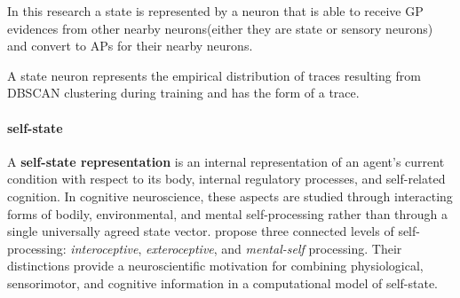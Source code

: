 \documentclass[a4paper]{article}
\begin{document}
                  In this research a state is represented by a neuron that is able to receive GP evidences from other nearby neurons(either they are state or sensory neurons) and convert to APs for their nearby neurons.

                  A state neuron represents the empirical distribution of traces resulting from DBSCAN clustering during training and has the form of a trace.

            \paragraph{self-state}

               A \textbf{self-state representation} is an internal representation of an agent's current condition with respect to its body, internal regulatory processes, and self-related cognition. In cognitive neuroscience, these aspects are studied through interacting forms of bodily, environmental, and mental self-processing rather than through a single universally agreed state vector. \cite{qin-2020-linking-bodily-environmental-and-mental-states-in-the-self} propose three connected levels of self-processing: \emph{interoceptive}, \emph{exteroceptive}, and \emph{mental-self} processing. Their distinctions provide a neuroscientific motivation for combining physiological, sensorimotor, and cognitive information in a computational model of self-state.
\end{document}
